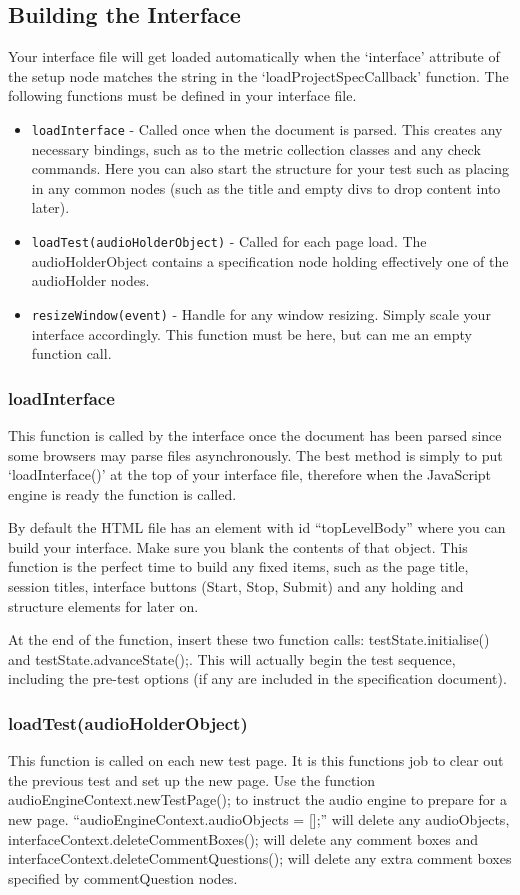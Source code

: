 \documentclass[11pt, oneside]{article}   	%
\begin{document}
	\subsection{Building the Interface}
		Your interface file will get loaded automatically when the `interface' attribute of the setup node matches the string in the `loadProjectSpecCallback' function. The following functions must be defined in your interface file.
		\begin{itemize}
		\item \texttt{loadInterface} - Called once when the document is parsed. This creates any necessary bindings, such as to the metric collection classes and any check commands. Here you can also start the structure for your test such as placing in any common nodes (such as the title and empty divs to drop content into later).
		\item \texttt{loadTest(audioHolderObject)} - Called for each page load. The audioHolderObject contains a specification node holding effectively one of the audioHolder nodes.
		\item \texttt{resizeWindow(event)} - Handle for any window resizing. Simply scale your interface accordingly. This function must be here, but can me an empty function call.
		\end{itemize}

		\subsubsection{loadInterface}
			This function is called by the interface once the document has been parsed since some browsers may parse files asynchronously. The best method is simply to put `loadInterface()' at the top of your interface file, therefore when the JavaScript engine is ready the function is called.

			By default the HTML file has an element with id ``topLevelBody'' where you can build your interface. Make sure you blank the contents of that object. This function is the perfect time to build any fixed items, such as the page title, session titles, interface buttons (Start, Stop, Submit) and any holding and structure elements for later on.

			At the end of the function, insert these two function calls: testState.initialise() and testState.advanceState();. This will actually begin the test sequence, including the pre-test options (if any are included in the specification document).

		\subsubsection{loadTest(audioHolderObject)}
			This function is called on each new test page. It is this functions job to clear out the previous test and set up the new page. Use the function audioEngineContext.newTestPage(); to instruct the audio engine to prepare for a new page. ``audioEngineContext.audioObjects = [];'' will delete any audioObjects, interfaceContext.deleteCommentBoxes(); will delete any comment boxes and interfaceContext.deleteCommentQuestions(); will delete any extra comment boxes specified by commentQuestion nodes.
\end{document}
